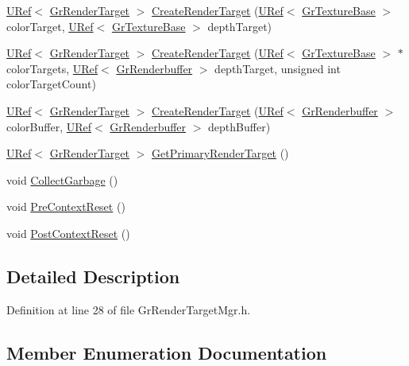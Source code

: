 \begin{CompactItemize}
\begin{CompactItemize}
\item 
\hyperlink{class_u_ref}{URef}$<$ \hyperlink{class_gr_render_target}{GrRenderTarget} $>$ \hyperlink{class_gr_render_target_mgr_97ebd15d7e11c6b8cf151c96237425cd}{CreateRenderTarget} (\hyperlink{class_u_ref}{URef}$<$ \hyperlink{class_gr_texture_base}{GrTextureBase} $>$ colorTarget, \hyperlink{class_u_ref}{URef}$<$ \hyperlink{class_gr_texture_base}{GrTextureBase} $>$ depthTarget)
\item 
\hyperlink{class_u_ref}{URef}$<$ \hyperlink{class_gr_render_target}{GrRenderTarget} $>$ \hyperlink{class_gr_render_target_mgr_cc419c722338e86241826a4f86ed9f96}{CreateRenderTarget} (\hyperlink{class_u_ref}{URef}$<$ \hyperlink{class_gr_texture_base}{GrTextureBase} $>$ $\ast$colorTargets, \hyperlink{class_u_ref}{URef}$<$ \hyperlink{class_gr_renderbuffer}{GrRenderbuffer} $>$ depthTarget, unsigned int colorTargetCount)
\item 
\hyperlink{class_u_ref}{URef}$<$ \hyperlink{class_gr_render_target}{GrRenderTarget} $>$ \hyperlink{class_gr_render_target_mgr_b46557c99e5ac73863beeb5d3d671302}{CreateRenderTarget} (\hyperlink{class_u_ref}{URef}$<$ \hyperlink{class_gr_renderbuffer}{GrRenderbuffer} $>$ colorBuffer, \hyperlink{class_u_ref}{URef}$<$ \hyperlink{class_gr_renderbuffer}{GrRenderbuffer} $>$ depthBuffer)
\item 
\hyperlink{class_u_ref}{URef}$<$ \hyperlink{class_gr_render_target}{GrRenderTarget} $>$ \hyperlink{class_gr_render_target_mgr_b48e6f9a057059671a40a6a6e09946b4}{GetPrimaryRenderTarget} ()
\item 
void \hyperlink{class_gr_render_target_mgr_a5f0a084c32ef56fc09838283c637cb7}{CollectGarbage} ()
\item 
void \hyperlink{class_gr_render_target_mgr_7cb3fe241f81eae3c989df80817ca521}{PreContextReset} ()
\item 
void \hyperlink{class_gr_render_target_mgr_9a98afe30d4cf8ed4387f491fa0c00a3}{PostContextReset} ()
\end{CompactItemize}


\subsection{Detailed Description}


Definition at line 28 of file GrRenderTargetMgr.h.

\subsection{Member Enumeration Documentation}
\hypertarget{class_gr_render_target_mgr_66d0ebb49e9781283d824f19f4bbc3f6}{
}
\end{CompactItemize}
